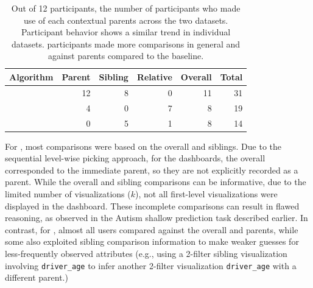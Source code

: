 \begin{table}[h!]
\centering
	\begin{tabular}{l|rrrr|r}
	\hline
	 Algorithm   &    Parent &   Sibling &   Relative & Overall &   Total \\
	\hline
	 \shortsystem     &    \cellcolor{blue!25} 12 &       8 &     0 &  11 &      \cellcolor{blue!25} 31 \\
	 \cluster     &         4 &        0 &         7 &          8 &      19 \\
	 \BFS         &         0 &        5 &         1 &          8 &      14 \\
	\hline
	\end{tabular}
\caption{Out of 12 participants, the number of participants who made use of each contextual parents across the two datasets. Participant behavior shows a similar trend in individual datasets. \system participants made more comparisons in general and against parents compared to the baseline.}
\label{table:contextualReferenceCount}
\end{table}
\par For \BFS, most comparisons were based on the overall and siblings. Due to the sequential level-wise picking approach, for the \BFS dashboards, the overall corresponded to the immediate parent, so they are not explicitly recorded as a parent. While the overall and sibling comparisons can be informative, due to the limited number of visualizations ($k$), not all first-level visualizations were displayed in the dashboard. These incomplete comparisons can result in flawed reasoning, as observed in the Autism shallow prediction task described earlier. In contrast, for \system, almost all users compared against the overall and parents, while some also exploited sibling comparison information to make weaker guesses for less-frequently observed attributes (e.g., using a 2-filter sibling visualization involving \texttt{driver\_age} to infer another 2-filter visualization \texttt{driver\_age} with a different parent.)
